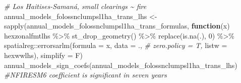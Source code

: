 \documentclass[10pt,landscape,a3paper]{article}
\newenvironment{Shaded}{\begin{snugshade}}{\end{snugshade}}
\newcommand{\AttributeTok}[1]{\textcolor[rgb]{0.77,0.63,0.00}{#1}}
\newcommand{\CommentTok}[1]{\textcolor[rgb]{0.56,0.35,0.01}{\textit{#1}}}
\newcommand{\ControlFlowTok}[1]{\textcolor[rgb]{0.13,0.29,0.53}{\textbf{#1}}}
\newcommand{\DecValTok}[1]{\textcolor[rgb]{0.00,0.00,0.81}{#1}}
\newcommand{\FunctionTok}[1]{\textcolor[rgb]{0.00,0.00,0.00}{#1}}
\newcommand{\NormalTok}[1]{#1}
\newcommand{\OtherTok}[1]{\textcolor[rgb]{0.56,0.35,0.01}{#1}}
\newcommand{\SpecialCharTok}[1]{\textcolor[rgb]{0.00,0.00,0.00}{#1}}
\begin{document}
\begin{Shaded}
\begin{Highlighting}[]
\CommentTok{\# Los Haitises{-}Samaná, small clearings \textasciitilde{} fire}
\NormalTok{annual\_models\_folossnclumpsl1ha\_trans\_lhs }\OtherTok{\textless{}{-}} \FunctionTok{sapply}\NormalTok{(annual\_models\_folossnclumpsl1ha\_trans\_formulas,}
                        \ControlFlowTok{function}\NormalTok{(x)}
\NormalTok{                          hexzonalfmtlhs }\SpecialCharTok{\%\textgreater{}\%}
                          \FunctionTok{st\_drop\_geometry}\NormalTok{() }\SpecialCharTok{\%\textgreater{}\%}
                          \FunctionTok{replace}\NormalTok{(}\FunctionTok{is.na}\NormalTok{(.), }\DecValTok{0}\NormalTok{) }\SpecialCharTok{\%\textgreater{}\%}
\NormalTok{                          spatialreg}\SpecialCharTok{::}\FunctionTok{errorsarlm}\NormalTok{(}\AttributeTok{formula =}\NormalTok{ x,}
                                                 \AttributeTok{data =}\NormalTok{ ., }\CommentTok{\# zero.policy = T,}
                                                 \AttributeTok{listw =}\NormalTok{ hexwwlhs),}
                        \AttributeTok{simplify =}\NormalTok{ F)}
\FunctionTok{annual\_models\_sign\_coefs}\NormalTok{(annual\_models\_folossnclumpsl1ha\_trans\_lhs) }\CommentTok{\#NFIRESM6 coefficient is significant in seven years}


\end{Highlighting}
\end{Shaded}
\end{document}
